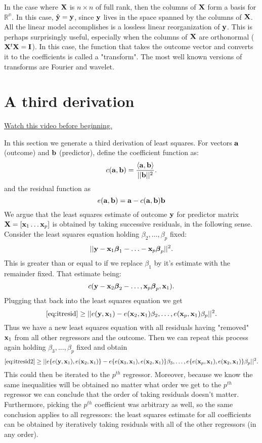 In the case where $\mathbf{X}$ is $n\times n$ of full rank,
then the columns of $\mathbf{X}$ form a basis for $\mathbb{R^n}$.
In this case, $\hat {\mathbf{y}} = \mathbf{y}$, since $\mathbf{y}$ lives
in the space spanned by the columns of $\mathbf{X}$. All
the linear model accomplishes is a lossless 
linear reorganization of $\mathbf{y}$. This is perhaps surprisingly
useful, especially when the columns of $\mathbf{X}$ are
orthonormal ($\mathbf{X}^t\mathbf{X} = \mathbf{I}$). In this case, the
function that takes the outcome vector and converts
it to the coefficients is called a "transform". The
most well known versions of transforms are Fourier and
wavelet. 

\section{A third derivation}

\href{https://www.youtube.com/watch?v=7_-ztDF4cwk&index=26&list=PLpl-gQkQivXhdgUCdaUQcdb31CRe8Mm2y}{Watch this video before beginning.}

In this section we generate a third derivation
of least squares. 
For vectors $\mathbf{a}$ (outcome) and $\mathbf{b}$ (predictor), define the coefficient function as:
$$
c(\mathbf{a}, \mathbf{b})
= \frac{\langle \mathbf{a}, \mathbf{b} \rangle}{|| \mathbf{b} ||^2}.
$$
and the residual function as
$$
e(\mathbf{a}, \mathbf{b}) = \mathbf{a} - c(\mathbf{a}, \mathbf{b}) \mathbf{b}
$$
We argue that the least squares estimate of outcome
$\mathbf{y}$ for predictor matrix $\mathbf{X} = [\mathbf{x}_1 \ldots \mathbf{x}_p]$
is obtained by taking successive residuals, in the following sense. Consider the least squares
equation holding $\beta_2, \ldots, \beta_p$ fixed:
\begin{equation}
\label{eq:itresid}
|| \mathbf{y} - \mathbf{x}_1 \boldsymbol{\beta}_1 - \ldots - \mathbf{x}_p \boldsymbol{\beta}_p||^2.
\end{equation}
This is greater than or equal to
if we replace $\beta_1$ by it's
estimate with the remainder fixed. That estimate
being:
$$
c(\mathbf{y} - \mathbf{x}_2 \boldsymbol{\beta}_2 - \ldots, \mathbf{x}_p \boldsymbol{\beta}_p, \mathbf{x}_1).
$$
Plugging that back into the least squares equation we
get
\begin{equation}
\label{eq:itresid2}
\eqref{eq:itresid}\geq ||e(\mathbf{y}, \mathbf{x}_1) - 
e(\mathbf{x}_2, \mathbf{x}_1) \beta_2, \ldots, e(\mathbf{x}_p, \mathbf{x}_1) \beta_p||^2.
\end{equation}
Thus we have a new least squares equation with 
all residuals having "removed" $\mathbf{x}_1$ from all other
regressors and the outcome. Then we can repeat this
process again holding $\beta_3, \ldots, \beta_p$
fixed and obtain
$$
\eqref{eq:itresid2}\geq ||e\{e(\mathbf{y}, \mathbf{x}_1), e(\mathbf{x}_2, \mathbf{x}_1)\} - 
e\{e(\mathbf{x}_3, \mathbf{x}_1), e(\mathbf{x}_2, \mathbf{x}_1)\} \beta_3, \ldots, e\{e(\mathbf{x}_p, \mathbf{x}_1), e(\mathbf{x}_{2}, \mathbf{x}_1)\} \beta_p||^2.
$$
This could then be iterated to the $p^{th}$ regressor.
Moreover, because we know the same inequalities will be
obtained no matter what order we get to the $p^{th}$
regressor we can conclude that the order of taking
residuals doesn't matter. Furthermore, picking the
$p^{th}$ coefficient was arbitrary as well, so the
same conclusion applies to all regressors: the
least squares estimate for all coefficients can be
obtained by iteratively taking residuals with all of the
other regressors (in any order). 

